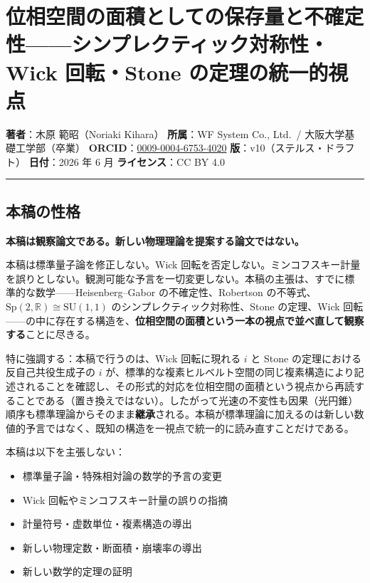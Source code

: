 \documentclass[
]{ltjsarticle}
\author{}
\date{}
\providecommand{\tightlist}{%
  \setlength{\itemsep}{0pt}\setlength{\parskip}{0pt}}
\begin{document}
\section{位相空間の面積としての保存量と不確定性------シンプレクティック対称性・Wick
回転・Stone
の定理の統一的視点}\label{ux4f4dux76f8ux7a7aux9593ux306eux9762ux7a4dux3068ux3057ux3066ux306eux4fddux5b58ux91cfux3068ux4e0dux78baux5b9aux6027ux30b7ux30f3ux30d7ux30ecux30afux30c6ux30a3ux30c3ux30afux5bfeux79f0ux6027wick-ux56deux8ee2stone-ux306eux5b9aux7406ux306eux7d71ux4e00ux7684ux8996ux70b9}

\textbf{著者}：木原 範昭（Noriaki Kihara） \textbf{所属}：WF System Co.,
Ltd.~/ 大阪大学基礎工学部（卒業）
\textbf{ORCID}：\href{https://orcid.org/0009-0004-6753-4020}{0009-0004-6753-4020}
\textbf{版}：v10（ステルス・ドラフト） \textbf{日付}：2026 年 6 月
\textbf{ライセンス}：CC BY 4.0

\begin{center}\rule{0.5\linewidth}{0.5pt}\end{center}

\subsection{本稿の性格}\label{ux672cux7a3fux306eux6027ux683c}

\textbf{本稿は観察論文である。新しい物理理論を提案する論文ではない。}

本稿は標準量子論を修正しない。Wick
回転を否定しない。ミンコフスキー計量を誤りとしない。観測可能な予言を一切変更しない。本稿の主張は、すでに標準的な数学------Heisenberg--Gabor
の不確定性、Robertson
の不等式、\(\mathrm{Sp}(2,\mathbb{R})\cong\mathrm{SU}(1,1)\)
のシンプレクティック対称性、Stone の定理、Wick
回転------の中に存在する構造を、\textbf{位相空間の面積という一本の視点で並べ直して観察する}ことに尽きる。

特に強調する：本稿で行うのは、Wick 回転に現れる \(i\) と Stone
の定理における反自己共役生成子の \(i\)
が、標準的な複素ヒルベルト空間の同じ複素構造により記述されることを確認し、その形式的対応を位相空間の面積という視点から再読することである（置き換えではない）。したがって光速の不変性も因果（光円錐）順序も標準理論からそのまま\textbf{継承}される。本稿が標準理論に加えるのは新しい数値的予言ではなく、既知の構造を一視点で統一的に読み直すことだけである。

本稿は以下を主張しない：

\begin{itemize}
\tightlist
\item
  標準量子論・特殊相対論の数学的予言の変更
\item
  Wick 回転やミンコフスキー計量の誤りの指摘
\item
  計量符号・虚数単位・複素構造の導出
\item
  新しい物理定数・断面積・崩壊率の導出
\item
  新しい数学的定理の証明
\end{itemize}
\end{document}
